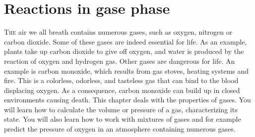 \documentclass[main.tex]{subfiles}
\begin{document}
\newcommand\chapterlabel{gases}
\linenumbers


\chapter[Gases ]{Reactions in gase phase}

\begin{marginfigure}
\end{marginfigure}


\lettrine[lines=4]{\color{black!45}T}{he} air we all breath contains numerous gases, such as oxygen, nitrogen or carbon dioxide. Some of these gases are indeed essential for life. As an example, plants take up carbon dioxide to give off oxygen, and water is produced by the reaction of oxygen and hydrogen gas. Other gases are dangerous for life. An example is carbon monoxide, which results from gas stoves, heating systems and fire. This is a colorless, odorless, and tasteless gas that can bind to the blood displacing oxygen. As a consequence, carbon monoxide can build up in closed environments causing death. This chapter deals with the properties of gases. You will learn how to calculate the volume or pressure of a gas, characterizing its state. You will also learn how to work with mixtures of gases and for example predict the pressure of oxygen in an atmosphere containing numerous gases.
\end{document}
